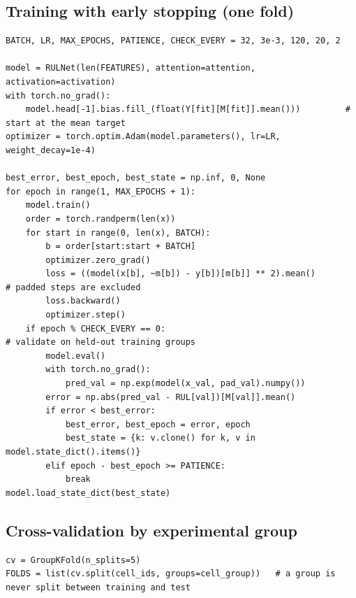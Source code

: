 \documentclass[conference]{IEEEtran}
\begin{document}
\subsection{Training with early stopping (one fold)}
\begin{lstlisting}
BATCH, LR, MAX_EPOCHS, PATIENCE, CHECK_EVERY = 32, 3e-3, 120, 20, 2

model = RULNet(len(FEATURES), attention=attention, activation=activation)
with torch.no_grad():
    model.head[-1].bias.fill_(float(Y[fit][M[fit]].mean()))         # start at the mean target
optimizer = torch.optim.Adam(model.parameters(), lr=LR, weight_decay=1e-4)

best_error, best_epoch, best_state = np.inf, 0, None
for epoch in range(1, MAX_EPOCHS + 1):
    model.train()
    order = torch.randperm(len(x))
    for start in range(0, len(x), BATCH):
        b = order[start:start + BATCH]
        optimizer.zero_grad()
        loss = ((model(x[b], ~m[b]) - y[b])[m[b]] ** 2).mean()         # padded steps are excluded
        loss.backward()
        optimizer.step()
    if epoch % CHECK_EVERY == 0:                                       # validate on held-out training groups
        model.eval()
        with torch.no_grad():
            pred_val = np.exp(model(x_val, pad_val).numpy())
        error = np.abs(pred_val - RUL[val])[M[val]].mean()
        if error < best_error:
            best_error, best_epoch = error, epoch
            best_state = {k: v.clone() for k, v in model.state_dict().items()}
        elif epoch - best_epoch >= PATIENCE:
            break
model.load_state_dict(best_state)
\end{lstlisting}

\subsection{Cross-validation by experimental group}
\begin{lstlisting}
cv = GroupKFold(n_splits=5)
FOLDS = list(cv.split(cell_ids, groups=cell_group))   # a group is never split between training and test
\end{lstlisting}
\end{document}
